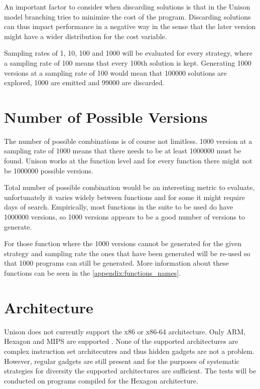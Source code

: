 An important factor to consider when discarding solutions is that in the Unison model
branching tries to minimize the cost of the program. Discarding solutions can thus impact
performance in a negative way in the sense that the later version might have a wider
distribution for the cost variable.

Sampling rates of 1, 10, 100 and 1000 will be evaluated for every strategy, where a
sampling rate of 100 means that every 100th solution is kept. Generating 1000 versions
at a sampling rate of 100 would mean that 100000 solutions are explored, 1000 are emitted
and 99000 are discarded.

\section{Number of Possible Versions}

The number of possible combinations is of course not limitless. 1000 version at a sampling
rate of 1000 means that there needs to be at least 1000000 must be found. Unison works
at the function level and for every function there might not be 1000000 possible versions.

Total number of possible combination would be an interesting metric to evaluate, unfortunately
it varies widely between functions and for some it might require days of search. Empirically,
most functions in the suite to be used do have 1000000 versions, so 1000 versions appears
to be a good number of versions to generate.

For those function where the 1000 versions cannot be generated for the given strategy and
sampling rate the ones that have been generated will be re-used so that 1000 programs can
still be generated. More information about these functions can be seen in the
\ref{appendix:functions_names}.

\section{Architecture}

Unison does not currently support the x86 or x86-64 architecture. Only ARM, Hexagon and MIPS
are supported \cite{unison-src}. None of the supported architectures are complex instruction
set architecutres and thus hidden gadgets are not a problem. However, regular gadgets are
still present and for the purposes of systematic strategies for diversity the supported
architectures are sufficient. The tests will be conducted on programs compiled for the
Hexagon architecture.


